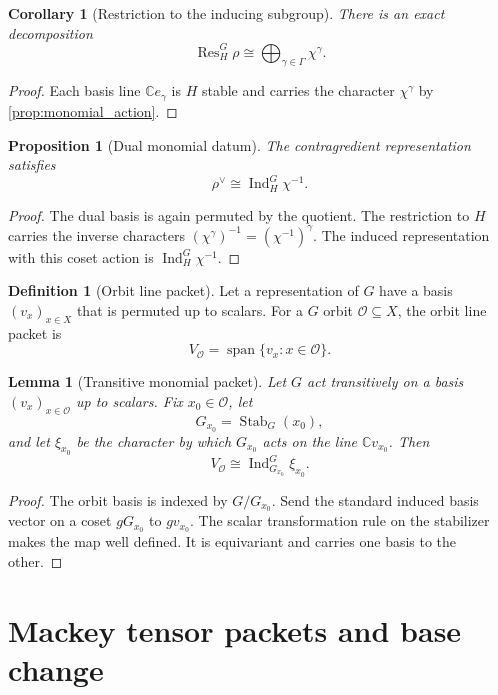 \documentclass{aomart}
\newtheorem{proposition}[proposition]{Proposition}
\newtheorem{lemma}[lemma]{Lemma}
\newtheorem{corollary}[corollary]{Corollary}
\theoremstyle{definition}
\newtheorem{definition}[definition]{Definition}
\theoremstyle{remark}
\newcommand{\CC}{\mathbb C}
\newcommand{\Ind}{\operatorname{Ind}}
\newcommand{\Res}{\operatorname{Res}}
\newcommand{\Stab}{\operatorname{Stab}}
\newcommand{\calO}{\mathcal O}
\begin{document}
\begin{corollary}[Restriction to the inducing subgroup]\label{cor:restriction_H}
There is an exact decomposition
\[
\boxed{
\Res_H^G\rho
\cong
\bigoplus_{\gamma\in\Gamma}\chi^\gamma.
}
\]
\end{corollary}

\begin{proof}
Each basis line \(\CC e_\gamma\) is \(H\) stable and carries the character \(\chi^\gamma\) by \cref{prop:monomial_action}.
\end{proof}

\begin{proposition}[Dual monomial datum]\label{prop:dual_monomial}
The contragredient representation satisfies
\[
\boxed{
\rho^\vee
\cong
\Ind_H^G\chi^{-1}.
}
\]
\end{proposition}

\begin{proof}
The dual basis is again permuted by the quotient. The restriction to \(H\) carries the inverse characters \((\chi^\gamma)^{-1}=(\chi^{-1})^\gamma\). The induced representation with this coset action is \(\Ind_H^G\chi^{-1}\).
\end{proof}

\begin{definition}[Orbit line packet]\label{def:orbit_line_packet}
Let a representation of \(G\) have a basis \((v_x)_{x\in X}\) that is permuted up to scalars. For a \(G\) orbit \(\calO\subseteq X\), the orbit line packet is
\[
V_{\calO}=\operatorname{span}\{v_x:x\in\calO\}.
\]
\end{definition}

\begin{lemma}[Transitive monomial packet]\label{lem:transitive_packet}
Let \(G\) act transitively on a basis \((v_x)_{x\in\calO}\) up to scalars. Fix \(x_0\in\calO\), let
\[
G_{x_0}=\Stab_G(x_0),
\]
and let \(\xi_{x_0}\) be the character by which \(G_{x_0}\) acts on the line \(\CC v_{x_0}\). Then
\[
\boxed{
V_{\calO}
\cong
\Ind_{G_{x_0}}^G\xi_{x_0}.
}
\]
\end{lemma}

\begin{proof}
The orbit basis is indexed by \(G/G_{x_0}\). Send the standard induced basis vector on a coset \(gG_{x_0}\) to \(gv_{x_0}\). The scalar transformation rule on the stabilizer makes the map well defined. It is equivariant and carries one basis to the other.
\end{proof}

\section{Mackey tensor packets and base change}\label{sec:mackey}
\end{document}
